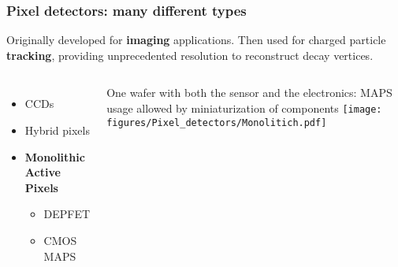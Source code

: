     \begin{frame}[noframenumbering]
        \frametitle{Pixel detectors: many different types}
        Originally developed for \textbf{imaging} applications. Then used for charged particle \textbf{tracking}, providing unprecedented resolution to reconstruct decay vertices.\\%
        \begin{columns}
                \begin{itemize}
                    \item CCDs 
                    \item Hybrid pixels 
                    \item \textbf{Monolithic Active Pixels}
                    \begin{itemize}
                        \item DEPFET %
                        \item CMOS MAPS
                    \end{itemize}
                \end{itemize}
                \medskip
                One wafer with both the sensor and the electronics: MAPS usage allowed by miniaturization of components
                \centering\texttt{[image: figures/Pixel\_detectors/Monolitich.pdf]} 
        \end{columns}
    \end{frame}

